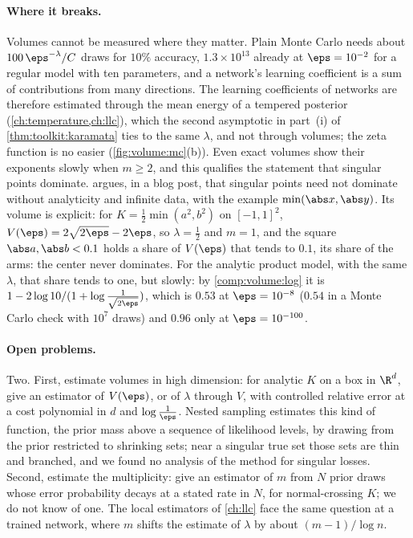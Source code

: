 \begin{refsection}
\paragraph{Where it breaks.} Volumes cannot be measured where they matter. Plain Monte Carlo needs about $100\,\eps^{-\lambda}/C$ draws for $10\%$ accuracy, $1.3\times10^{13}$ already at $\eps=10^{-2}$ for a regular model with ten parameters, and a network's learning coefficient is a sum of contributions from many directions. The learning coefficients of networks are therefore estimated through the mean energy of a tempered posterior (\cref{ch:temperature,ch:llc}), which the second asymptotic in part~(i) of \cref{thm:toolkit:karamata} ties to the same $\lambda$, and not through volumes; the zeta function is no easier (\cref{fig:volume:mc}(b)). Even exact volumes show their exponents slowly when $m\ge2$, and this qualifies the statement that singular points dominate. \Textcite{Skalse2023} argues, in a blog post, that singular points need not dominate without analyticity and infinite data, with the example $\min(\abs x,\abs y)$. Its volume is explicit: for $K=\frac12\min(a^2,b^2)$ on $[-1,1]^2$, $V(\eps)=2\sqrt{2\eps}-2\eps$, so $\lambda=\frac12$ and $m=1$, and the square $\abs a,\abs b<0.1$ holds a share of $V(\eps)$ that tends to $0.1$, its share of the arms: the center never dominates. For the analytic product model, with the same $\lambda$, that share tends to one, but slowly: by \cref{comp:volume:log} it is $1-2\log10/(1+\log\frac1{\sqrt{2\eps}})$, which is $0.53$ at $\eps=10^{-8}$ ($0.54$ in a Monte Carlo check with $10^7$ draws) and $0.96$ only at $\eps=10^{-100}$.

\paragraph{Open problems.} Two. First, estimate volumes in high dimension: for analytic $K$ on a box in $\R^d$, give an estimator of $V(\eps)$, or of $\lambda$ through $V$, with controlled relative error at a cost polynomial in $d$ and $\log\frac1\eps$. Nested sampling \parencite{Skilling2006} estimates this kind of function, the prior mass above a sequence of likelihood levels, by drawing from the prior restricted to shrinking sets; near a singular true set those sets are thin and branched, and we found no analysis of the method for singular losses. Second, estimate the multiplicity: give an estimator of $m$ from $N$ prior draws whose error probability decays at a stated rate in $N$, for normal-crossing $K$; we do not know of one. The local estimators of \cref{ch:llc} face the same question at a trained network, where $m$ shifts the estimate of $\lambda$ by about $(m-1)/\log n$.


\end{refsection}
